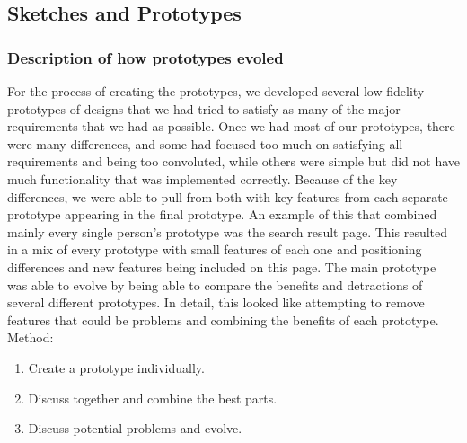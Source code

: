 \documentclass[11pt,english]{article}
\begin{document}
\subsection{Sketches and Prototypes}
\subsubsection{Description of how prototypes evoled}
For the process of creating the prototypes, we developed several low-fidelity prototypes of designs that we had tried to satisfy as many of the major requirements that we had as possible. Once we had most of our prototypes, there were many differences, and some had focused too much on satisfying all requirements and being too convoluted, while others were simple but did not have much functionality that was implemented correctly. Because of the key differences, we were able to pull from both with key features from each separate prototype appearing in the final prototype. An example of this that combined mainly every single person's prototype was the search result page. This resulted in a mix of every prototype with small features of each one and positioning differences and new features being included on this page. The main prototype was able to evolve by being able to compare the benefits and detractions of several different prototypes. In detail, this looked like attempting to remove features that could be problems and combining the benefits of each prototype.
\newline
\newline
Method:
\begin{enumerate}
  \item Create a prototype individually.
  \item Discuss together and combine the best parts.
  \item Discuss potential problems and evolve.
\end{enumerate}
\end{document}

